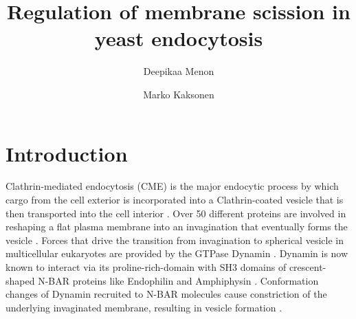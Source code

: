 \documentclass[9pt,lineno]{elife}
\title{Regulation of membrane scission in yeast endocytosis}
\author[1]{Deepikaa Menon}
\author[1*]{Marko Kaksonen}
\affil[1]{Department of Biochemistry, University of Geneva, Geneva, Switzerland}
\begin{document}
\maketitle

\begin{abstract}

\end{abstract}


\section{Introduction}

Clathrin-mediated endocytosis (CME) is the major endocytic process by which cargo from the cell exterior is incorporated into a Clathrin-coated vesicle that is then transported into the cell interior \citep{Bitsikas2014}. Over 50 different proteins are involved in reshaping a flat plasma membrane into an invagination that eventually forms the vesicle \cite{Kaksonen2018}. Forces that drive the transition from invagination to spherical vesicle in multicellular eukaryotes are provided by the GTPase Dynamin \cite{Grigliatti1973, Sweitzer1998, Ferguson2007,Takei1995, Galli2017}. Dynamin is now known to interact via its proline-rich-domain with SH3 domains of crescent-shaped N-BAR proteins like Endophilin and Amphiphysin  \cite{Grabs1997,Cestra1999,Farsad2001,Ferguson2009,Meinecke2013b}. Conformation changes of Dynamin recruited to N-BAR molecules cause constriction of the underlying invaginated membrane, resulting in vesicle formation  \cite{Shupliakov1997,Zhang2001,Zhao2016}.

~\\
\end{document}
